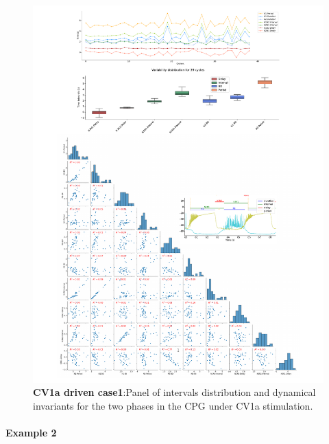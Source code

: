 \begin{figure}[htbp]
	\centering
	\includegraphics[width=1.1\textwidth]{./invariants/data/SUSSEX/CV1a_driven1/images/2phases/panel_with_pairplot.pdf}
	\caption{\textbf{CV1a driven case1}:Panel of intervals distribution and dynamical invariants for the two phases in the CPG under CV1a stimulation.}
	\label{fig:cv1a 1 2phases pairplot}
\end{figure}



\paragraph{\large{Example 2}}


